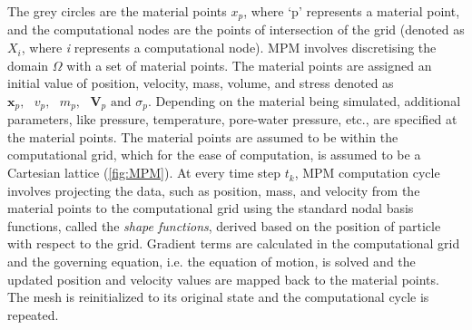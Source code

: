 The grey circles are the material points $x_{p}$, where `p' represents 
a material point, and the computational nodes are the points of intersection of 
the grid (denoted as $X_{i}$, where \textit{i} represents a computational 
node). MPM involves discretising the domain $\Omega$ with 
a set of material points. The material points are assigned an initial value of 
position, velocity, mass, volume, and stress denoted as $\mathbf{x}_{p},\mbox{  
} \mathbf{\mathit{v}}_{p},\mbox{  } \mathit{m}_{p}, \mbox{  
}\mathbf{V}_{p}\mbox{ and }\sigma_{p} $. Depending on the material being 
simulated, additional parameters, like pressure, temperature, pore-water 
pressure, etc., are specified at the material points. The material points are 
assumed to be within the computational grid, which for the ease of computation, 
is assumed to be a Cartesian lattice (\cref{fig:MPM}). At 
every time step $\mathit{t}_{k}$, MPM computation cycle involves projecting 
the data, such as position, mass, and velocity from the material points to the 
computational grid using the standard nodal basis functions, called the 
\textit{shape functions}, derived based on the position of particle with 
respect to the grid. Gradient terms are calculated in the computational grid 
and the governing equation, i.e. the equation of motion, is solved and the 
updated position and velocity values are mapped back to the material points. 
The mesh is reinitialized to its original state and the computational cycle is 
repeated. 

